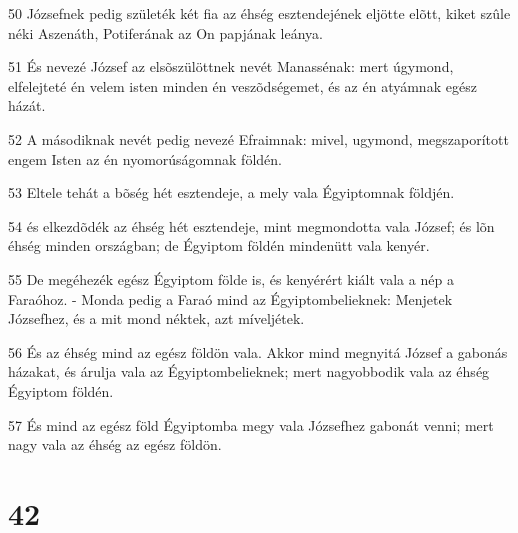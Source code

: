 \par 50 Józsefnek pedig születék két fia az éhség esztendejének eljötte elõtt, kiket szûle néki Aszenáth, Potiferának az On papjának leánya.
\par 51 És nevezé József az elsõszülöttnek nevét Manassénak: mert úgymond, elfelejteté én velem isten minden én veszõdségemet, és az én atyámnak egész házát.
\par 52 A másodiknak nevét pedig nevezé Efraimnak: mivel, ugymond, megszaporított engem Isten az én nyomorúságomnak földén.
\par 53 Eltele tehát a bõség hét esztendeje, a mely vala Égyiptomnak földjén.
\par 54 és elkezdõdék az éhség  hét esztendeje, mint megmondotta vala József; és lõn éhség minden országban; de Égyiptom földén mindenütt vala kenyér.
\par 55 De megéhezék egész Égyiptom földe is, és kenyérért kiált vala a nép a Faraóhoz. - Monda pedig a Faraó mind az Égyiptombelieknek: Menjetek Józsefhez, és a mit mond néktek, azt míveljétek.
\par 56 És az éhség mind az egész földön vala. Akkor mind megnyitá József a gabonás házakat, és árulja vala az Égyiptombelieknek; mert nagyobbodik vala az éhség Égyiptom földén.
\par 57 És mind az egész föld Égyiptomba megy vala Józsefhez gabonát venni; mert nagy vala az éhség az egész földön.

\chapter{42}

